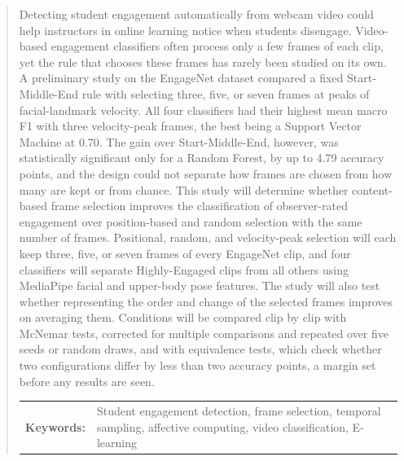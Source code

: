 \begin{abstract}
Detecting student engagement automatically from webcam video could help instructors in online learning notice when students disengage. Video-based engagement classifiers often process only a few frames of each clip, yet the rule that chooses these frames has rarely been studied on its own. A preliminary study on the EngageNet dataset compared a fixed Start-Middle-End rule with selecting three, five, or seven frames at peaks of facial-landmark velocity. All four classifiers had their highest mean macro F1 with three velocity-peak frames, the best being a Support Vector Machine at 0.70. The gain over Start-Middle-End, however, was statistically significant only for a Random Forest, by up to 4.79 accuracy points, and the design could not separate how frames are chosen from how many are kept or from chance. This study will determine whether content-based frame selection improves the classification of observer-rated engagement over position-based and random selection with the same number of frames. Positional, random, and velocity-peak selection will each keep three, five, or seven frames of every EngageNet clip, and four classifiers will separate Highly-Engaged clips from all others using MediaPipe facial and upper-body pose features. The study will also test whether representing the order and change of the selected frames improves on averaging them. Conditions will be compared clip by clip with McNemar tests, corrected for multiple comparisons and repeated over five seeds or random draws, and with equivalence tests, which check whether two configurations differ by less than two accuracy points, a margin set before any results are seen.

\begin{flushleft}
\begin{tabular}{lp{4.25in}}
\hspace{-0.5em}\textbf{Keywords:}\hspace{0.25em} & Student engagement detection, frame selection, temporal sampling, affective computing, video classification, E-learning \\
\end{tabular}
\end{flushleft}
\end{abstract}
